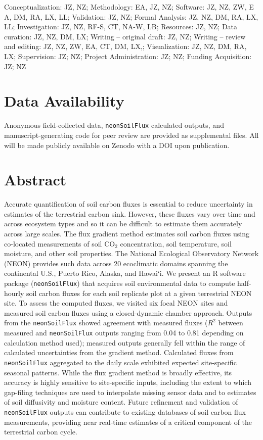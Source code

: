 \documentclass[
  letterpaper,
  DIV=11,
  numbers=noendperiod]{scrartcl}
\begin{document}
Conceptualization: JZ, NZ; Methodology: EA, JZ, NZ; Software: JZ, NZ,
ZW, E A, DM, RA, LX, LL; Validation: JZ, NZ; Formal Analysis: JZ, NZ,
DM, RA, LX, LL; Investigation: JZ, NZ, RF-S, CT, NA-W, LB; Resources:
JZ, NZ; Data curation: JZ, NZ, DM, LX; Writing -- original draft: JZ,
NZ; Writing -- review and editing: JZ, NZ, ZW, EA, CT, DM, LX,;
Visualization: JZ, NZ, DM, RA, LX; Supervision: JZ; NZ; Project
Administration: JZ; NZ; Funding Acquisition: JZ; NZ

\section*{Data Availability}\label{data-availability}

Anonymous field-collected data, \texttt{neonSoilFlux} calculated
outputs, and manuscript-generating code for peer review are provided as
supplemental files. All will be made publicly available on Zenodo with a
DOI upon publication.

\newpage

\section{Abstract}\label{abstract}

Accurate quantification of soil carbon fluxes is essential to reduce
uncertainty in estimates of the terrestrial carbon sink. However, these
fluxes vary over time and across ecosystem types and so it can be
difficult to estimate them accurately across large scales. The flux
gradient method estimates soil carbon fluxes using co-located
measurements of soil CO\(_{2}\) concentration, soil temperature, soil
moisture, and other soil properties. The National Ecological Observatory
Network (NEON) provides such data across 20 ecoclimatic domains spanning
the continental U.S., Puerto Rico, Alaska, and Hawai`i. We present an R
software package (\texttt{neonSoilFlux}) that acquires soil
environmental data to compute half-hourly soil carbon fluxes for each
soil replicate plot at a given terrestrial NEON site. To assess the
computed fluxes, we visited six focal NEON sites and measured soil
carbon fluxes using a closed-dynamic chamber approach. Outputs from the
\texttt{neonSoilFlux} showed agreement with measured fluxes (\(R^{2}\)
between measured and \texttt{neonSoilFlux} outputs ranging from 0.04 to
0.81 depending on calculation method used); measured outputs generally
fell within the range of calculated uncertainties from the gradient
method. Calculated fluxes from \texttt{neonSoilFlux} aggregated to the
daily scale exhibited expected site-specific seasonal patterns. While
the flux gradient method is broadly effective, its accuracy is highly
sensitive to site-specific inputs, including the extent to which
gap-filing techniques are used to interpolate missing sensor data and to
estimates of soil diffusivity and moisture content. Future refinement
and validation of \texttt{neonSoilFlux} outputs can contribute to
existing databases of soil carbon flux measurements, providing near
real-time estimates of a critical component of the terrestrial carbon
cycle.
\end{document}
